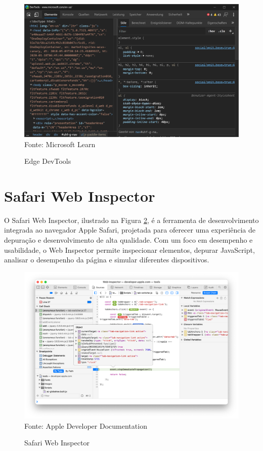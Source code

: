 \begin{figure}[!htb]
    \centering
    \caption{Edge DevTools}
    \includegraphics[width=0.8\linewidth]{assets/edge.png}\\
    {\footnotesize Fonte: Microsoft Learn}
    \label{fig:edge}
\end{figure}
\section{Safari Web Inspector}
O Safari Web Inspector, ilustrado na Figura \ref{fig:safari}, é a ferramenta de desenvolvimento integrada ao navegador Apple Safari, projetada para oferecer uma experiência de depuração e desenvolvimento de alta qualidade. Com um foco em desempenho e usabilidade, o Web Inspector permite inspecionar elementos, depurar JavaScript, analisar o desempenho da página e simular diferentes dispositivos\cite{apple}.
\begin{figure}[!htb]
    \centering
    \caption{Safari Web Inspector}
    \includegraphics[width=0.8\linewidth]{assets/safari.png}\\
    {\footnotesize Fonte: Apple Developer Documentation}
    \label{fig:safari}
\end{figure}